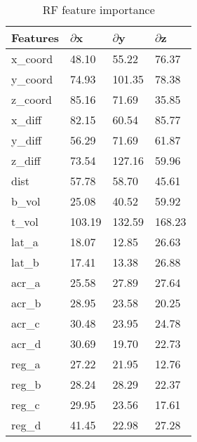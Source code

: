 \begin{table}[!htb]
\centering
\begin{tabular}{l|lll}
\textbf{Features} & \textbf{$\partial$x} & \textbf{$\partial$y}   & \textbf{$\partial$z}   \\ \hline
x\_coord          & 48.10         & 55.22  & 76.37  \\ \hline
y\_coord          & 74.93         & 101.35 & 78.38  \\ \hline
z\_coord          & 85.16         & 71.69  & 35.85  \\ \hline
x\_diff           & 82.15         & 60.54  & 85.77  \\ \hline
y\_diff           & 56.29         & 71.69  & 61.87  \\ \hline
z\_diff           & 73.54         & 127.16 & 59.96  \\ \hline
dist              & 57.78         & 58.70  & 45.61  \\ \hline
b\_vol            & 25.08         & 40.52 & 59.92 \\ \hline
t\_vol            & 103.19        & 132.59 & 168.23 \\ \hline
lat\_a            & 18.07         & 12.85  & 26.63 \\ \hline
lat\_b            & 17.41         & 13.38  & 26.88 \\ \hline
acr\_a            & 25.58         & 27.89  & 27.64  \\ \hline
acr\_b            & 28.95         & 23.58  & 20.25  \\ \hline
acr\_c            & 30.48         & 23.95  & 24.78  \\ \hline
acr\_d            & 30.69         & 19.70  & 22.73  \\ \hline
reg\_a            & 27.22         & 21.95  & 12.76  \\ \hline
reg\_b            & 28.24         & 28.29  & 22.37  \\ \hline
reg\_c            & 29.95         & 23.56  & 17.61  \\ \hline
reg\_d            & 41.45         & 22.98  & 27.28 
\end{tabular}
\caption{RF feature importance}
\label{tab:rf_feature_imp}
\end{table}

